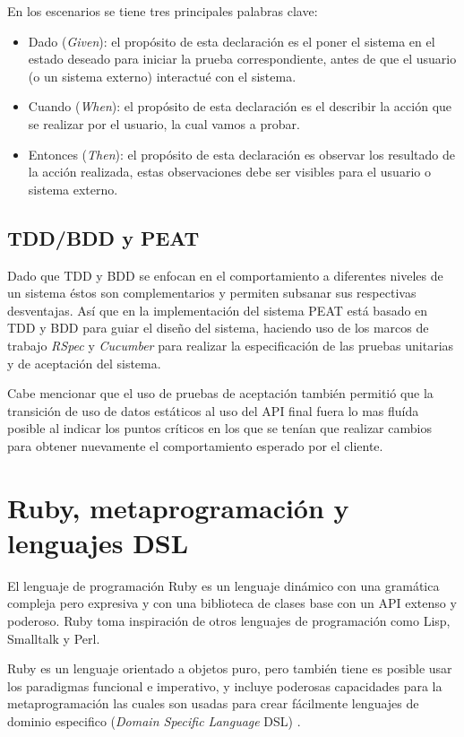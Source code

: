 En los escenarios se tiene tres principales palabras clave:
\begin{itemize}
\item Dado (\textit{Given}): el propósito de esta declaración es el poner
  el sistema en el estado deseado para iniciar la prueba correspondiente,
  antes de que el usuario (o un sistema externo) interactué con el sistema.
\item Cuando (\textit{When}): el propósito de esta declaración es el describir
  la acción que se realizar por el usuario, la cual vamos a probar.
\item Entonces (\textit{Then}): el propósito de esta declaración es observar
  los resultado de la acción realizada, estas observaciones debe ser visibles
  para el usuario o sistema externo.
\end{itemize}

\subsection{TDD/BDD y PEAT}
Dado que TDD y BDD se enfocan en el comportamiento a diferentes niveles
de un sistema éstos son complementarios y permiten subsanar sus respectivas
desventajas. Así que en la implementación del sistema PEAT está basado en
TDD y BDD para guiar el diseño del sistema, haciendo uso de los marcos
de trabajo \textit{RSpec} y \textit{Cucumber} para realizar la especificación
de las pruebas unitarias y de aceptación del sistema.

Cabe mencionar que el uso de pruebas de aceptación también permitió que la
transición de uso de datos estáticos al uso del API final fuera lo mas fluída
posible al indicar los puntos críticos en los que se tenían que realizar cambios
para obtener nuevamente el comportamiento esperado por el cliente.

\section{Ruby, metaprogramación y lenguajes DSL}
El lenguaje de programación Ruby es un lenguaje dinámico con una gramática compleja
pero expresiva y con una biblioteca de clases base con un API extenso y poderoso.
Ruby toma inspiración de otros lenguajes de programación como Lisp, Smalltalk y Perl.

Ruby es un lenguaje orientado a objetos puro, pero también tiene es posible
usar los paradigmas funcional e imperativo, y incluye poderosas capacidades para
la metaprogramación las cuales son usadas para crear fácilmente lenguajes
de dominio especifico (\textit{Domain Specific Language} DSL)
\cite{24_matsumoto_2008}.

